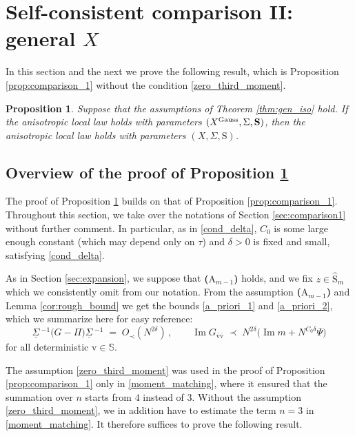 \documentclass[11pt]{article} %
\numberwithin{equation}{section}
\numberwithin{figure}{section}
\theoremstyle{plain} %
\newtheorem{proposition}[theorem]{Proposition}
\theoremstyle{definition} %
\newcommand{\f}[1]{\boldsymbol{\mathrm{#1}}} %
\newcommand{\bb}{\mathbb} %
\newcommand{\ul}[1]{\underline{#1} \!\,} %
\newcommand{\wh}{\widehat}
\newcommand{\txt}[1]{\text{\rm{#1}}}
\newcommand{\pb}[1]{\bigl({#1}\bigr)}
\DeclareMathOperator{\im}{Im}
\begin{document}
\section{Self-consistent comparison II: general $X$} \label{sec:self-const_II}

In this section and the next we prove the following result, which is Proposition \ref{prop:comparison_1} without the condition \eqref{zero_third_moment}.

\begin{proposition} \label{prop:comparison_2}
Suppose that the assumptions of Theorem \ref{thm:gen_iso} hold. If the anisotropic local law holds with parameters $(X^{\txt{Gauss}}, \Sigma, \f S)$, then the anisotropic local law holds with parameters $(X, \Sigma, \f S)$.
\end{proposition}




\subsection{Overview of the proof of Proposition \ref{prop:comparison_2}} \label{sec:sketch_proof_7}
The proof of Proposition \ref{prop:comparison_2} builds on that of Proposition \ref{prop:comparison_1}. Throughout this section, we take over the notations of Section \ref{sec:comparison1} without further comment. In particular, as in \eqref{cond_delta}, $C_0$ is some large enough constant (which may depend only on $\tau$) and $\delta > 0$ is fixed and small, satisfying \eqref{cond_delta}.


As in Section \ref{sec:expansion}, we suppose that \textbf{($\f A_{m - 1}$)} holds, and we fix $z \in \wh{\f S}_m$ which we consistently omit from our notation. From the assumption \textbf{($\f A_{m - 1}$)} and Lemma \ref{cor:rough_bound} we get the bounds \eqref{a_priori_1} and \eqref{a_priori_2}, which we summarize here for easy reference:
\begin{equation} \label{sec7_assumpt}
\ul \Sigma^{-1} \pb{G - \Pi} \ul \Sigma^{-1} \;=\; O_\prec(N^{2 \delta}) \,, \qquad
\im G_{\bar {\f v} \bar {\f v}} \;\prec\; N^{2 \delta} \pb{\im m + N^{C_0 \delta} \Psi}
\end{equation}
for all deterministic $\f v \in \bb S$.


The assumption \eqref{zero_third_moment} was used in the proof of Proposition \ref{prop:comparison_1} only in \eqref{moment_matching}, where it ensured that the summation over $n$ starts from $4$ instead of $3$. Without the assumption \eqref{zero_third_moment}, we in addition have to estimate the term $n = 3$ in \eqref{moment_matching}. It therefore suffices to prove the following result.
\end{document}
